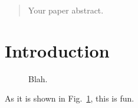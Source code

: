 \begin{abstract}
Your paper abstract.
\end{abstract}

% 
% 

\section{Introduction}
\label{sec:introduction}

\begin{figure}
	\label{fig:some_figure}
	\caption{Blah.}
\end{figure}

As it is shown in Fig.~\ref{fig:some_figure}, this is fun.


\lipsum


\putbib

% 
